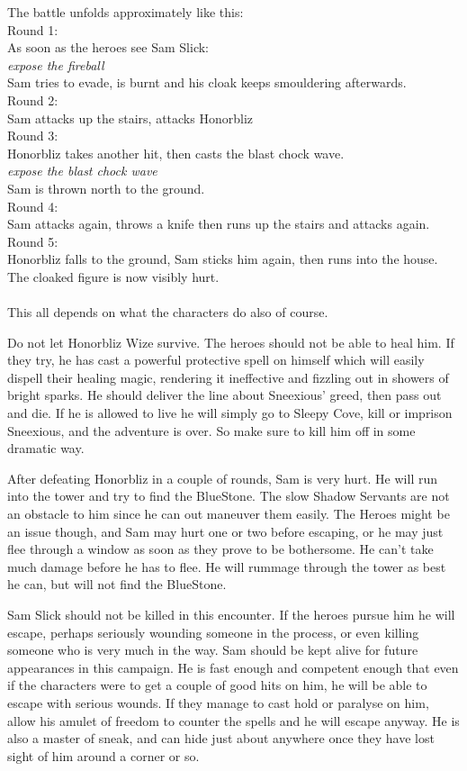 The battle unfolds approximately like this: \\
Round 1: \\
As soon as the heroes see Sam Slick: \\
\emph{expose the fireball} \\
Sam tries to evade, is burnt and his cloak keeps smouldering afterwards. \\
Round 2: \\
Sam attacks up the stairs, attacks Honorbliz \\
Round 3: \\
Honorbliz takes another hit, then casts the blast chock wave. \\
\emph{expose the blast chock wave} \\
Sam is thrown north to the ground. \\
Round 4:  \\
Sam attacks again, throws a knife then runs up the stairs and attacks again. \\
Round 5: \\
Honorbliz falls to the ground, Sam sticks him again, then runs into the house. The cloaked figure is now visibly hurt. \\
\\
This all depends on what the characters do also of course.

Do not let Honorbliz Wize survive. The heroes should not be able to heal him. If they try, he has cast a powerful protective spell on himself which will easily dispell their healing magic, rendering it ineffective and fizzling out in showers of bright sparks. He should deliver the line about Sneexious' greed, then pass out and die.
If he is allowed to live he will simply go to Sleepy Cove, kill or imprison Sneexious, and the adventure is over. So make sure to kill him off in some dramatic way.

After defeating Honorbliz in a couple of rounds, Sam is very hurt. He will run into the tower and try to find the BlueStone. The slow Shadow Servants are not an obstacle to him since he can out maneuver them easily. The Heroes might be an issue though, and Sam may hurt one or two before escaping, or he may just flee through a window as soon as they prove to be bothersome. He can't take much damage before he has to flee. He will rummage through the tower as best he can, but will not find the BlueStone.

Sam Slick should not be killed in this encounter. If the heroes pursue him he will escape, perhaps seriously wounding someone in the process, or even killing someone who is very much in the way. Sam should be kept alive for future appearances in this campaign. He is fast enough and competent enough that even if the characters were to get a couple of good hits on him, he will be able to escape with serious wounds. If they manage to cast hold or paralyse on him, allow his amulet of freedom to counter the spells and he will escape anyway. He is also a master of sneak, and can hide just about anywhere once they have lost sight of him around a corner or so.


